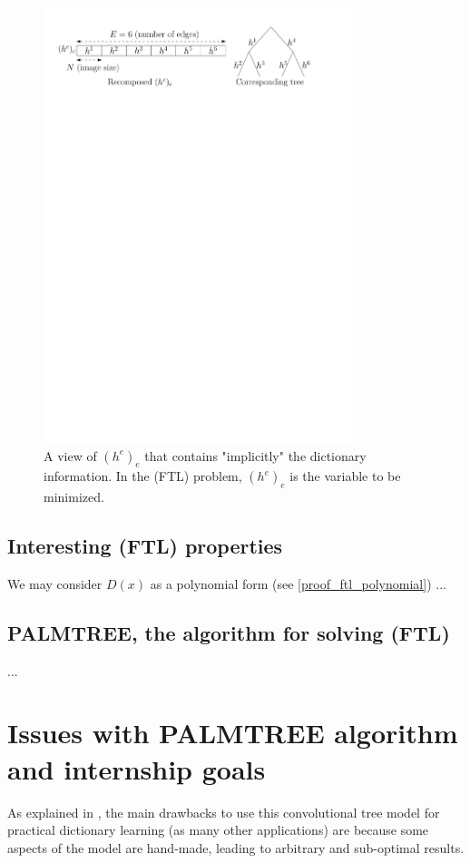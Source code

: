 \begin{figure}[!ht] \centering
\includegraphics[width=0.8\textwidth]{figures/hk_tree.pdf}
\caption{A view of $(h^e)_e$ that contains "implicitly" the dictionary information. In the (FTL) problem, $(h^e)_e$ is the variable to be minimized.}\label{fig_hk_tree}
\end{figure}

\subsection{Interesting (FTL) properties}
We may consider $D(x)$ as a polynomial form (see \ref{proof_ftl_polynomial}) ...

\subsection{PALMTREE, the algorithm for solving (FTL)}
...

\section{Issues with PALMTREE algorithm and internship goals}
As explained in \cite[p. 23]{chabiron_optimization_2016}, the main drawbacks to use this convolutional tree model for practical dictionary learning (as many other applications) are because some aspects of the model are hand-made, leading to arbitrary and sub-optimal results.
